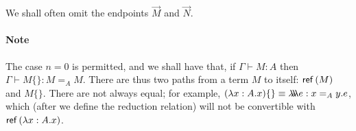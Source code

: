We shall often omit the endpoints $\vec{M}$ and $\vec{N}$.

\paragraph{Note}
The case $n = 0$ is permitted, and we shall have that, if $\Gamma \vdash M : A$ then $\Gamma \vdash M \{\} : M =_A M$.  There are thus two paths from a term $M$ to itself: $\mathsf{ref} \left( {M} \right)$ and $M \{\}$.  There are not always equal; for example, $(\lambda x:A.x) \{\} \equiv \lambda \!\! \lambda \!\! \lambda e : x =_A y. e$, which (after we define the reduction relation) will not be convertible with $\mathsf{ref} \left( {\lambda x:A.x} \right)$.  

\begin{code}%
\> \AgdaSymbol{:}     \<%
\\
\>   \AgdaSymbol{=}      \<%
\end{code}

